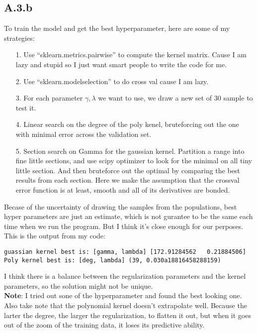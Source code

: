 \documentclass[]{article}
\begin{document}
    \subsection*{A.3.b}
        To train the model and get the best hyperparameter, here are some of my strategies: 
        \begin{enumerate}
            \item[1.] Use ``sklearn.metrics.pairwise'' to compute the kernel matrix. Cause I am lazy and stupid so I just want smart people to write the code for me. 
            \item[2.] Use ``sklearn.modelselection'' to do cross val cause I am lazy. 
            \item[3.] For each parameter $\gamma, \lambda$ we want to use, we draw a new set of 30 sample to test it. 
            \item[4.] Linear search on the degree of the poly kenel, bruteforcing out the one with minimal error across the validation set. 
            \item[5.] Section search on Gamma for the gaussian kernel. Partition a range into fine little sections, and use scipy optimizer to look for the minimal on all tiny little section. And then bruteforce out the optimal by comparing the best results from each section. Here we make the assumption that the crossval error function is at least, smooth and all of its derivatives are bonded. 
        \end{enumerate}
        Becase of the uncertainty of drawing the samples from the populations, best hyper parameters are just an estimate, which is not gurantee to be the same each time when we run the program. But I think it's close enough for our perposes. 
        \\
        This is the output from my code: 
        \begin{verbatim}
guassian kernel best is: [gamma, lambda] [172.91284562   0.21884506]
Poly kernel best is: [deg, lambda] (39, 0.030a18816458288159)
        \end{verbatim}
        I think there is a balance between the regularization parameters and the kernel parameters, so the solution might not be unique. 
        \\
        \textbf{Note}: I tried out sone of the hyperparameter and found the best looking one. Also take note that the polynomial kernel doesn't extrapolate well. Because the larter the degree, the larger the regularization, to flatten it out, but when it goes out of the zoom of the training data, it loses its predictive ability.
\end{document}
